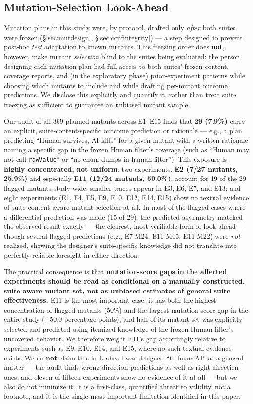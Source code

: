 \documentclass[10pt,conference]{IEEEtran}
\begin{document}
\subsection{Mutation-Selection Look-Ahead}
\label{sec:lookahead}
Mutation plans in this study were, by protocol, drafted only \emph{after} both suites were frozen (\S\ref{sec:mutdesign}, \S\ref{sec:confintegrity}) — a step designed to prevent post-hoc \emph{test} adaptation to known mutants. This freezing order does \textbf{not}, however, make mutant \emph{selection} blind to the suites being evaluated: the person designing each mutation plan had full access to both suites' frozen content, coverage reports, and (in the exploratory phase) prior-experiment patterns while choosing which mutants to include and while drafting per-mutant outcome predictions. We disclose this explicitly and quantify it, rather than treat suite freezing as sufficient to guarantee an unbiased mutant sample.

Our audit of all 369 planned mutants across E1--E15 finds that \textbf{29 (7.9\%)} carry an explicit, suite-content-specific outcome prediction or rationale — e.g., a plan predicting ``Human survives, AI kills'' for a given mutant with a written rationale naming a specific gap in the frozen Human filter's coverage (such as ``Human may not call \texttt{rawValue}'' or ``no enum dumps in human filter''). This exposure is \textbf{highly concentrated, not uniform}: two experiments, \textbf{E2 (7/27 mutants, 25.9\%)} and especially \textbf{E11 (12/24 mutants, 50.0\%)}, account for 19 of the 29 flagged mutants study-wide; smaller traces appear in E3, E6, E7, and E13; and eight experiments (E1, E4, E5, E9, E10, E12, E14, E15) show no textual evidence of suite-content-aware mutant selection at all. In most of the flagged cases where a differential prediction was made (15 of 29), the predicted asymmetry matched the observed result exactly — the clearest, most verifiable form of look-ahead — though several flagged predictions (e.g., E7-M24, E11-M05, E11-M22) were \emph{not} realized, showing the designer's suite-specific knowledge did not translate into perfectly reliable foresight in either direction.

The practical consequence is that \textbf{mutation-score gaps in the affected experiments should be read as conditional on a manually constructed, suite-aware mutant set, not as unbiased estimates of general suite effectiveness.} E11 is the most important case: it has both the highest concentration of flagged mutants (50\%) and the largest mutation-score gap in the entire study (+50.0 percentage points), and half of its mutant set was explicitly selected and predicted using itemized knowledge of the frozen Human filter's uncovered behavior. We therefore weight E11's gap accordingly relative to experiments such as E9, E10, E14, and E15, where no such textual evidence exists. We do \textbf{not} claim this look-ahead was designed ``to favor AI'' as a general matter — the audit finds wrong-direction predictions as well as right-direction ones, and eleven of fifteen experiments show no evidence of it at all — but we also do not minimize it: it is a first-class, quantified threat to validity, not a footnote, and it is the single most important limitation identified in this paper.
\end{document}
